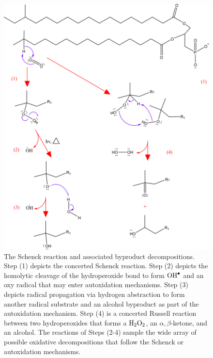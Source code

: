 \begin{figure}[t]
    \centering
    \includegraphics[width = \textwidth]{images/PDIpy/BCFA_schenck_oxidation_2.png}
    \caption{
         The Schenck reaction and associated byproduct decompositions. Step (1) depicts the concerted\cite{Foote1968PhotosensitizedOxygen} Schenck reaction. Step (2) depicts the homolytic cleavage of the hydroperoxide bond to form $\ce{OH^.}$ and an oxy radical that may enter autoxidation mechanisms. Step (3) depicts radical propagation via hydrogen abstraction to form another radical substrate and an alcohol byproduct as part of the autoxidation mechanism. Step (4) is a concerted Russell reaction\cite{Russell1957Deuterium-isotopeRadicals,Howard1968TheMechanism} between two hydroperoxides that forms a $\ce{H2O2}$, an $\alpha,\beta$-ketone, and an alcohol. The reactions of Steps (2-4) sample the wide array of possible oxidative decompositions that follow the Schenck or autoxidation mechanisms.
    }
    \label{schenck_mechanism}
\end{figure}


